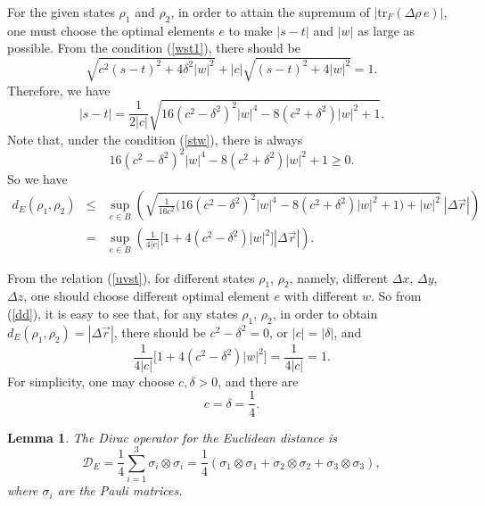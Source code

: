 \documentclass[a4paper,12pt]{article}
\newtheorem{lemma}{Lemma}
\begin{document}
For the given states $\rho_1$ and $\rho_2$, in order to attain the supremum of $|\mathrm{tr}_{F}(\Delta\rho\, e)|$, one must choose the optimal elements $e$ to make $|s-t|$ and $|w|$ as large as possible. From the condition (\ref{wst1}), there should be
\begin{equation}
	\sqrt{c^2 (s - t)^2 + 4 \delta^2 |w|^2} + |c| \sqrt{(s - t)^2 + 4|w|^2}= 1.
\end{equation}
Therefore, we have
\begin{equation}
	|s-t|=\frac{1}{2|c|}\sqrt{16 (c^2 - \delta^2)^2 |w|^4 - 8 (c^2 + \delta^2) |w|^2 + 1}.
\end{equation}
Note that, under the condition (\ref{stw}), there is always
\begin{equation}
	16 (c^2 - \delta^2)^2 |w|^4 - 8 (c^2 + \delta^2) |w|^2 + 1\geqslant 0	.
\end{equation}
So we have
\begin{eqnarray}\label{dd}
	d_E(\rho_1,\rho_2)&\leqslant&\sup_{e\in B}\left(\sqrt{\frac{1}{16 c^2}\big(16 (c^2 - \delta^2)^2 |w|^4 - 8 (c^2 + \delta^2) |w|^2 + 1\big)+|w|^2}\ 
	|\Delta\vec{r}|\right)\nonumber\\
	&=&\sup_{e\in B}\left(\frac{1}{4 |c|} \big[1+ 4 (c^2 - \delta^2) |w|^2\big] 
	|\Delta\vec{r}|\right).
\end{eqnarray}

From the relation (\ref{uvst}), for different states $\rho_1$, $\rho_2$, namely, different $\Delta x$, $\Delta y$, $\Delta z$, one should choose different optimal element $e$ with different $w$.
So from (\ref{dd}), it is easy to see that, for any states $\rho_1$, $\rho_2$, 
in order to obtain $d_E(\rho_1,\rho_2)=|\Delta\vec{r}|$,
there should be $c^2- \delta^2=0$, or $|c|=|\delta|$, and
\begin{equation}
	\frac{1}{4 |c|} \big[1+4 (c^2 - \delta^2) |w|^2\big]=\frac{1}{4 |c|}=1.
\end{equation}
For simplicity, one may choose $c,\delta>0$, and there are
\begin{equation}
	c=\delta=\frac{1}{4}.
\end{equation}
\begin{lemma}
	The Dirac operator for the Euclidean distance is
	\begin{equation}
		\mathcal{D}_{E} = \frac{1}{4} \sum_{i=1}^{3} \sigma_i\otimes \sigma _{i}  = \frac{1}{4} \left ( \sigma_1\otimes \sigma _{1}  + \sigma_2\otimes \sigma _{2}  + \sigma_3\otimes \sigma _{3} \right ), 
	\end{equation}
	where $\sigma_i$ are the Pauli matrices.
\end{lemma}
\end{document}
